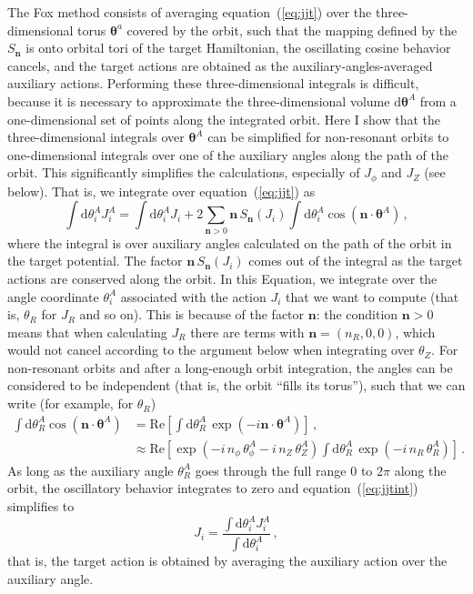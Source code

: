 \documentclass{emulateapj}
\newcommand{\dd}{\mathrm{d}}
\newcommand{\eqnname}{equation}
\renewcommand{\vec}[1]{\ensuremath{\mathbf{#1}}}
\newcommand{\vecn}{\ensuremath{\vec{n}}}
\newcommand{\veca}{\ensuremath{\boldsymbol\theta}}
\begin{document}
The Fox method consists of averaging \eqnname~(\ref{eq:jjt}) over the
three-dimensional torus $\veca^a$ covered by the orbit, such that the
mapping defined by the $S_{\vecn}$ is onto orbital tori of the target
Hamiltonian, the oscillating cosine behavior cancels, and the target
actions are obtained as the auxiliary-angles-averaged auxiliary
actions. Performing these three-dimensional integrals is difficult,
because it is necessary to approximate the three-dimensional volume
$\dd \veca^A$ from a one-dimensional set of points along the
integrated orbit. Here I show that the three-dimensional integrals
over $\veca^A$ can be simplified for non-resonant orbits to
one-dimensional integrals over one of the auxiliary angles along the
path of the orbit. This significantly simplifies the calculations,
especially of $J_\phi$ and $J_Z$ (see below). That is, we integrate
over \eqnname~(\ref{eq:jjt}) as
\begin{equation}\label{eq:jjtint}
  \int \dd \theta_i^A J_i^A = \int \dd \theta_i^A J_i + 2 \sum_{\vecn > 0} \vecn\,S_{\vecn}(J_i)\int \dd \theta_i^A\cos(\vecn\cdot\veca^A)\,,
\end{equation}
where the integral is over auxiliary angles calculated on the path of
the orbit in the target potential. The factor $\vecn\,S_{\vecn}(J_i)$
comes out of the integral as the target actions are conserved along
the orbit. In this Equation, we integrate over the angle coordinate
$\theta_i^A$ associated with the action $J_i$ that we want to compute
(that is, $\theta_R$ for $J_R$ and so on). This is because of the
factor $\vecn$: the condition $\vecn > 0$ means that when calculating
$J_R$ there are terms with $\vecn = (n_R,0,0)$, which would not cancel
according to the argument below when integrating over $\theta_Z$. For
non-resonant orbits and after a long-enough orbit integration, the
angles can be considered to be independent (that is, the orbit ``fills
its torus''), such that we can write (for example, for $\theta_R$)
\begin{equation}
\begin{split}
  \int \dd \theta_R^A\cos(\vecn\cdot\veca^A) & = \mathrm{Re}\left[\int \dd \theta_R^A\,\exp(-i\vecn\cdot\veca^A)\right]\,, \\
  & \approx \mathrm{Re}\left[\exp(-i\,n_\phi\,\theta^A_\phi-i\,n_Z\,\theta^A_Z)\int \dd \theta_R^A\,\exp(-i\,n_R\,\theta^A_R)\right]\,.
\end{split}
\end{equation}
As long as the auxiliary angle $\theta^A_R$ goes through the full range
$0$ to $2\pi$ along the orbit, the oscillatory behavior integrates to
zero and \eqnname~(\ref{eq:jjtint}) simplifies to
\begin{equation}\label{eq:aAIJ}
  J_i = \frac{\int \dd \theta_i^A J_i^A}{\int \dd \theta_i^A}\,,
\end{equation}
that is, the target action is obtained by averaging the auxiliary
action over the auxiliary angle. 
\end{document}
